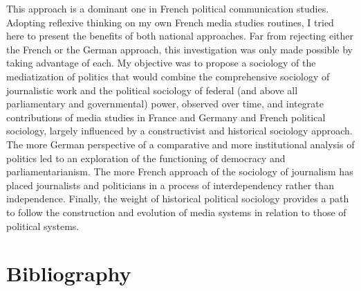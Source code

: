 \documentclass{tufte-handout}
\begin{document}
This approach is a dominant one in French political communication
studies. Adopting reflexive thinking on my own French media studies
routines, I tried here to present the benefits of both national
approaches. Far from rejecting either the French or the German approach,
this investigation was only made possible by taking advantage of each.
My objective was to propose a sociology of the mediatization of politics
that would combine the comprehensive sociology of journalistic work and
the political sociology of federal (and above all parliamentary and
governmental) power, observed over time, and integrate contributions of
media studies in France and Germany and French political sociology,
largely influenced by a constructivist and historical sociology
approach. The more German perspective of a comparative and more
institutional analysis of politics led to an exploration of the
functioning of democracy and parliamentarianism. The more French
approach of the sociology of journalism has placed journalists and
politicians in a process of interdependency rather than independence.
Finally, the weight of historical political sociology provides a path to
follow the construction and evolution of media systems in relation to
those of political systems.




\section{Bibliography}\label{bibliography}
\end{document}
